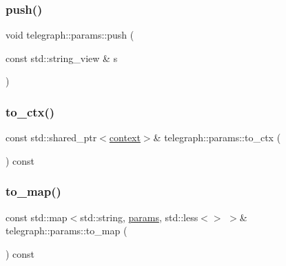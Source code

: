\mbox{\label{classtelegraph_1_1params_a4dbcc0f56b0a8cc959e0ff806da8bbf9}} 
\subsubsection{\texorpdfstring{push()}{push()}\hspace{0.1cm}{\footnotesize\ttfamily [3/3]}}
{\footnotesize\ttfamily void telegraph\+::params\+::push (\begin{DoxyParamCaption}\item[{const std\+::string\+\_\+view \&}]{s }\end{DoxyParamCaption})\hspace{0.3cm}{\ttfamily [inline]}}

\mbox{\label{classtelegraph_1_1params_a9c2e5ddc7236063fc7b0066fecb5b52a}} 
\subsubsection{\texorpdfstring{to\+\_\+ctx()}{to\_ctx()}}
{\footnotesize\ttfamily const std\+::shared\+\_\+ptr$<$\hyperlink{classtelegraph_1_1context}{context}$>$\& telegraph\+::params\+::to\+\_\+ctx (\begin{DoxyParamCaption}{ }\end{DoxyParamCaption}) const\hspace{0.3cm}{\ttfamily [inline]}}

\mbox{\label{classtelegraph_1_1params_a28ac587e330dc76ecb08fd3fbc19dd3a}} 
\subsubsection{\texorpdfstring{to\+\_\+map()}{to\_map()}}
{\footnotesize\ttfamily const std\+::map$<$std\+::string, \hyperlink{classtelegraph_1_1params}{params}, std\+::less$<$$>$ $>$\& telegraph\+::params\+::to\+\_\+map (\begin{DoxyParamCaption}{ }\end{DoxyParamCaption}) const\hspace{0.3cm}{\ttfamily [inline]}}

